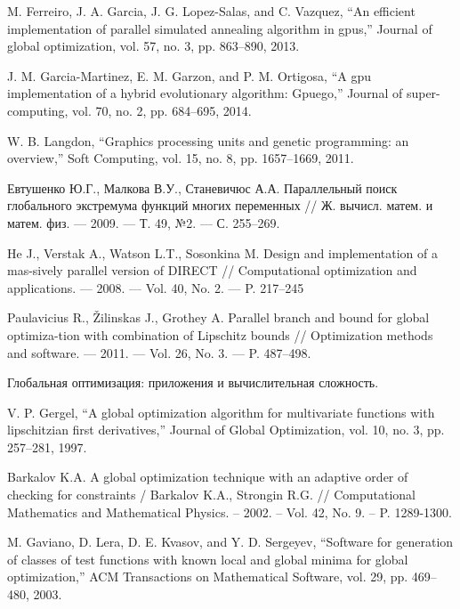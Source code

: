 \documentclass{svproc}
\begin{document}
%
%

\begin{thebibliography}{6}
%

M. Ferreiro, J. A. Garcia, J. G. Lopez-Salas, and C. Vazquez, “An efficient implementation of parallel simulated annealing algorithm in gpus,” Journal of global optimization, vol. 57, no. 3, pp. 863–890, 2013.

J. M. Garcia-Martinez, E. M. Garzon, and P. M. Ortigosa, “A gpu implementation of a hybrid evolutionary algorithm: Gpuego,” Journal of super-computing, vol. 70, no. 2, pp. 684–695, 2014.

W. B. Langdon, “Graphics processing units and genetic programming: an overview,” Soft Computing, vol. 15, no. 8, pp. 1657–1669, 2011.





Евтушенко Ю.Г., Малкова В.У., Станевичюс А.А. Параллельный поиск глобального экстремума функций многих переменных // Ж. вычисл. матем. и матем. физ. — 2009. — Т. 49, №2. — С. 255–269.

He J., Verstak A., Watson L.T., Sosonkina M. Design and implementation of a mas-sively parallel version of DIRECT // Computational optimization and applications. — 2008. — Vol. 40, No. 2. — P. 217–245

Paulavicius R., Žilinskas J., Grothey A. Parallel branch and bound for global optimiza-tion with combination of Lipschitz bounds // Optimization methods and software. — 2011. — Vol. 26, No. 3. — P. 487–498.

Глобальная оптимизация: приложения и вычислительная сложность. %




V. P. Gergel, “A global optimization algorithm for multivariate functions with lipschitzian first derivatives,” Journal of Global Optimization, vol. 10, no. 3, pp. 257–281, 1997.

Barkalov K.A. A global optimization technique with an adaptive order of checking for constraints / Barkalov K.A., Strongin R.G. // Computational Mathematics and Mathematical Physics. – 2002. – Vol. 42, No. 9. – P. 1289-1300.

M. Gaviano, D. Lera, D. E. Kvasov, and Y. D. Sergeyev, “Software for generation of classes of test functions with known local and global minima for global optimization,” ACM Transactions on Mathematical Software, vol. 29, pp. 469–480, 2003.


\end{thebibliography}
\end{document}
